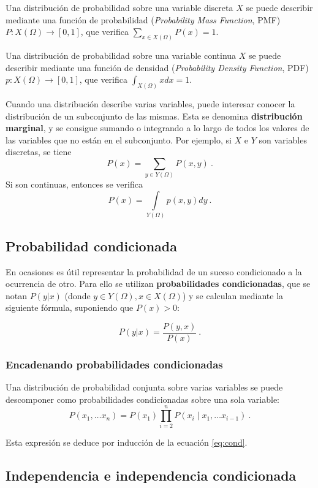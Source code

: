 Una distribución de probabilidad sobre una variable discreta \(X\) se
puede describir mediante una función de probabilidad (\emph{Probability
Mass Function}, PMF) \(P:X(\Omega)\rightarrow [0,1]\), que verifica
\(\sum_{x\in X(\Omega)} P(x)=1\).

Una distribución de probabilidad sobre una variable continua \(X\) se
puede describir mediante una función de densidad (\emph{Probability
Density Function}, PDF) \(p:X(\Omega)\rightarrow [0,1]\), que verifica
\(\int_{X(\Omega)} x dx=1\).

Cuando una distribución describe varias variables, puede interesar
conocer la distribución de un subconjunto de las mismas. Esta se
denomina \textbf{distribución marginal}, y se consigue sumando o
integrando a lo largo de todos los valores de las variables que no están
en el subconjunto. Por ejemplo, si \(X\) e \(Y\) son variables
discretas, se tiene \[P(x) = \sum_{y\in Y(\Omega)}P(x, y)~.\] Si son
continuas, entonces se verifica
\[P(x) = \int\limits_{Y(\Omega)}p(x, y)dy~.\]

\subsection{Probabilidad condicionada}\label{probabilidad-condicionada}

En ocasiones es útil representar la probabilidad de un suceso
condicionado a la ocurrencia de otro. Para ello se utilizan
\textbf{probabilidades condicionadas}, que se notan \(P(y|x)\) (donde
\(y\in Y(\Omega), x\in X(\Omega)\)) y se calculan mediante la siguiente
fórmula, suponiendo que \(P(x) > 0\):

\begin{equation}P(y|x)=\frac{P(y,x)}{P(x)}~.\label{eq:cond}\end{equation}

\subsubsection{Encadenando probabilidades
condicionadas}\label{encadenando-probabilidades-condicionadas}

Una distribución de probabilidad conjunta sobre varias variables se
puede descomponer como probabilidades condicionadas sobre una sola
variable:
\[P(x_1, \dots x_n) = P(x_1)\prod\limits_{i=2}^n P(x_i\mid x_1, \dots x_{i-1})~.\]

Esta expresión se deduce por inducción de la ecuación \ref{eq:cond}.

\subsection{Independencia e independencia
condicionada}\label{independencia-e-independencia-condicionada}

